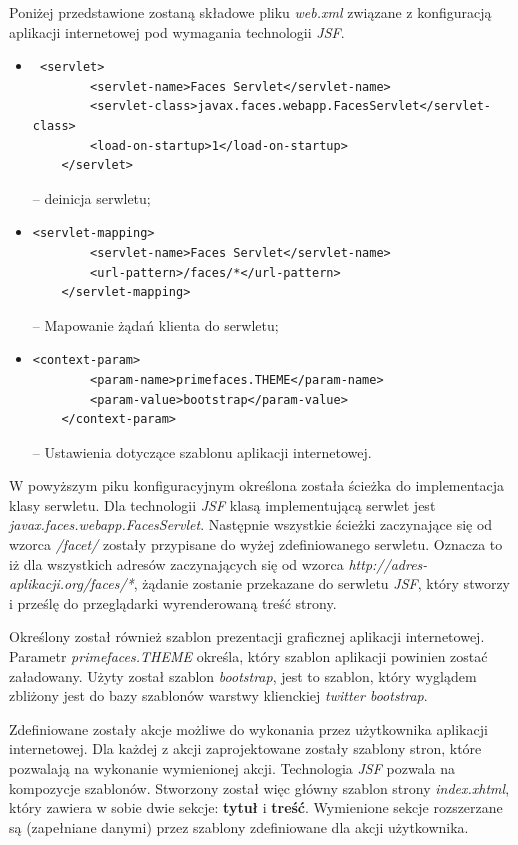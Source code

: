 Poniżej przedstawione zostaną składowe pliku \textit{web.xml} związane z konfiguracją aplikacji internetowej pod wymagania technologii \textit{JSF}.

\begin{itemize}
	\item  {\footnotesize \begin{verbatim} <servlet>
        <servlet-name>Faces Servlet</servlet-name>
        <servlet-class>javax.faces.webapp.FacesServlet</servlet-class>
        <load-on-startup>1</load-on-startup>
    </servlet> \end{verbatim}} -- deinicja serwletu;
 	\item  {\footnotesize \begin{verbatim}<servlet-mapping>
        <servlet-name>Faces Servlet</servlet-name>
        <url-pattern>/faces/*</url-pattern>
    </servlet-mapping>\end{verbatim}} -- Mapowanie żądań klienta do serwletu;
    
    \item  {\footnotesize \begin{verbatim}<context-param>
        <param-name>primefaces.THEME</param-name>
        <param-value>bootstrap</param-value>
    </context-param>\end{verbatim}} -- Ustawienia dotyczące szablonu aplikacji internetowej.
\end{itemize}

W powyższym piku konfiguracyjnym określona została ścieżka do implementacja klasy serwletu. Dla technologii \textit{JSF} klasą implementującą serwlet jest \textit{javax.faces.webapp.FacesServlet}. Następnie wszystkie ścieżki zaczynające się od wzorca \textit{/facet/} zostały przypisane do wyżej zdefiniowanego serwletu. Oznacza to iż dla wszystkich adresów zaczynających się od wzorca \textit{http://adres-aplikacji.org/faces/*}, żądanie zostanie przekazane do serwletu \textit{JSF}, który stworzy i prześlę do przeglądarki wyrenderowaną treść strony.

Określony został również szablon prezentacji graficznej aplikacji internetowej. Parametr \textit{primefaces.THEME} określa, który szablon aplikacji powinien zostać załadowany. Użyty został szablon \textit{bootstrap}, jest to szablon, który wyglądem zbliżony jest do bazy szablonów warstwy klienckiej \textit{twitter bootstrap}.


Zdefiniowane zostały akcje możliwe do wykonania przez użytkownika aplikacji internetowej. Dla każdej z akcji zaprojektowane zostały szablony stron, które pozwalają na wykonanie wymienionej akcji. Technologia \textit{JSF} pozwala na kompozycje szablonów. Stworzony został więc główny szablon strony \textit{index.xhtml}, który zawiera w sobie dwie sekcje: \textbf{tytuł} i \textbf{treść}. Wymienione sekcje rozszerzane są (zapełniane danymi) przez szablony zdefiniowane dla akcji użytkownika.

